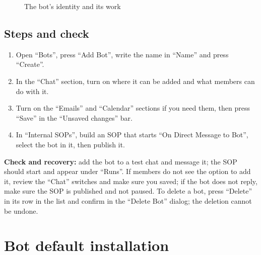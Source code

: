 \begin{figure}[H]
\centering
{}
\rclegend
\caption{The bot's identity and its work}
\label{fig:builder-bots-model}
\end{figure}

\subsection{Steps and check}
\begin{enumerate}
\item Open “Bots”, press “Add Bot”, write the name in “Name” and press “Create”.
\item In the “Chat” section, turn on where it can be added and what members can do with it.
\item Turn on the “Emails” and “Calendar” sections if you need them, then press “Save” in the “Unsaved changes” bar.
\item In “Internal SOPs”, build an SOP that starts “On Direct Message to Bot”, select the bot in it, then publish it.
\end{enumerate}

\textbf{Check and recovery:} add the bot to a test chat and message it; the SOP should start and appear under “Runs”. If members do not see the option to add it, review the “Chat” switches and make sure you saved; if the bot does not reply, make sure the SOP is published and not paused. To delete a bot, press “Delete” in its row in the list and confirm in the “Delete Bot” dialog; the deletion cannot be undone.

\clearpage
\section{Bot default installation}
\label{sec:builder-feature-bots-default-installation}

